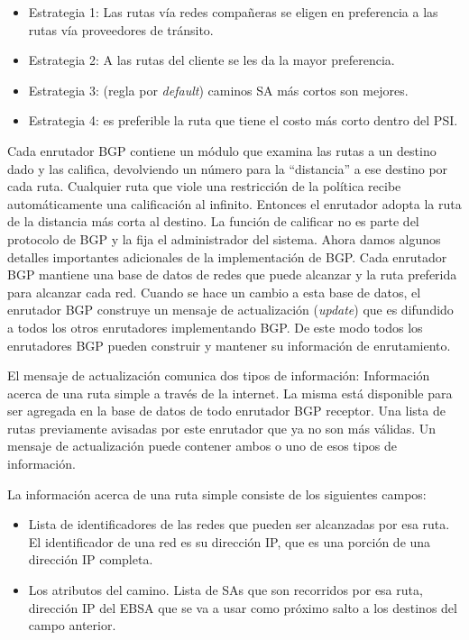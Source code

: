 \documentclass[10pt,a4paper]{report}
\begin{document}
	\begin{itemize}
		\item Estrategia 1: Las rutas vía redes compañeras se eligen en preferencia a las rutas vía proveedores de tránsito.
		\item Estrategia 2: A las rutas del cliente se les da la mayor preferencia.
		\item Estrategia 3: (regla por \textit{default}) caminos SA más cortos son mejores.
		\item Estrategia 4: es preferible la ruta que tiene el costo más corto dentro del PSI.
	\end{itemize}

	\par Cada enrutador BGP contiene un módulo que examina las rutas a un destino dado y las califica, devolviendo un número para la “distancia” a ese destino por cada ruta. Cualquier ruta que viole una restricción de la política recibe automáticamente una calificación al infinito. Entonces el enrutador adopta la ruta de la distancia más corta al destino. La función de calificar no es parte del protocolo de BGP y la fija el administrador del sistema. Ahora damos algunos detalles importantes adicionales de la implementación de BGP. Cada enrutador BGP mantiene una base de datos de redes que puede alcanzar y la ruta preferida para alcanzar cada red. Cuando se hace un cambio a esta base de datos, el enrutador BGP construye un mensaje de actualización (\textit{update}) que es difundido a todos los otros enrutadores implementando BGP. De este modo todos los enrutadores BGP pueden construir y mantener su información de enrutamiento.

	\par El mensaje de actualización comunica dos tipos de información:
Información acerca de una ruta simple a través de la internet. La misma está disponible para ser agregada en la base de datos de todo enrutador BGP receptor. Una lista de rutas previamente avisadas por este enrutador que ya no son más válidas. Un mensaje de actualización puede contener ambos o uno de esos tipos de información.

	\par La información acerca de una ruta simple consiste de los siguientes campos:
	\begin{itemize}
		\item Lista de identificadores de las redes que pueden ser alcanzadas por esa ruta. El identificador de una red es su dirección IP, que es una porción de una dirección IP completa.
		\item Los atributos del camino. Lista de SAs que son recorridos por esa ruta, dirección IP del EBSA que se va a usar como próximo salto a los destinos del campo anterior.
	\end{itemize}
	
\end{document}
